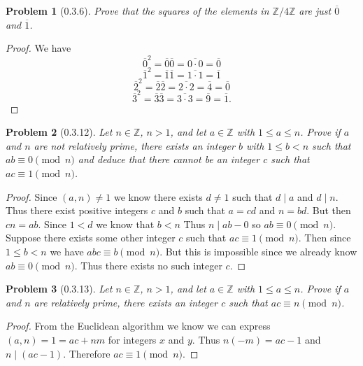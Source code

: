 \documentclass{article}
\newtheorem{problem}{Problem}
\begin{document}

\begin{problem}[0.3.6]
Prove that the squares of the elements in $\mathbb{Z}/4\mathbb{Z}$ are just $\overline{0}$ and $\overline{1}$.
\end{problem}
\begin{proof}
We have
\[
\overline{0}^2 = \overline{0}\overline{0} = \overline{0 \cdot 0} = \overline{0}
\]
\[
\overline{1}^2 = \overline{1}\overline{1} = \overline{1 \cdot 1} = \overline{1}
\]
\[
\overline{2}^2 = \overline{2}\overline{2} = \overline{2 \cdot 2} = \overline{4} = \overline{0}
\]
\[
\overline{3}^2 = \overline{3}\overline{3} = \overline{3 \cdot 3} = \overline{9} = \overline{1}.
\]
\end{proof}

\begin{problem}[0.3.12]
Let $n \in \mathbb{Z}$, $n > 1$, and let $a \in \mathbb{Z}$ with $1 \leq a \leq n$. Prove if $a$ and $n$ are not relatively prime, there exists an integer $b$ with $1 \leq b < n$ such that $ab \equiv 0 \pmod{n}$ and deduce that there cannot be an integer $c$ such that $ac \equiv 1 \pmod{n}$.
\end{problem}
\begin{proof}
Since $(a,n) \neq 1$ we know there exists $d \neq 1$ such that $d \mid a$ and $d \mid n$. Thus there exist positive integers $c$ and $b$ such that $a = cd$ and $n = bd$. But then $cn = ab$. Since $1 < d$ we know that $b < n$ Thus $n \mid ab - 0$ so $ab \equiv 0 \pmod{n}$. Suppose there exists some other integer $c$ such that $ac \equiv 1 \pmod{n}$. Then since $1 \leq b < n$ we have $abc \equiv b \pmod {n}$. But this is impossible since we already know $ab \equiv 0 \pmod{n}$. Thus there exists no such integer $c$.
\end{proof}

\begin{problem}[0.3.13]
Let $n \in \mathbb{Z}$, $n > 1$, and let $a \in \mathbb{Z}$ with $1 \leq a \leq n$. Prove if $a$ and $n$ are relatively prime, there exists an integer $c$ such that $ac \equiv n \pmod{n}$.
\end{problem}
\begin{proof}
From the Euclidean algorithm we know we can express $(a,n) = 1 = ac + nm$ for integers $x$ and $y$. Thus $n(-m) = ac - 1$ and $n \mid (ac - 1)$. Therefore $ac \equiv 1 \pmod{n}$.
\end{proof}
\end{document}
